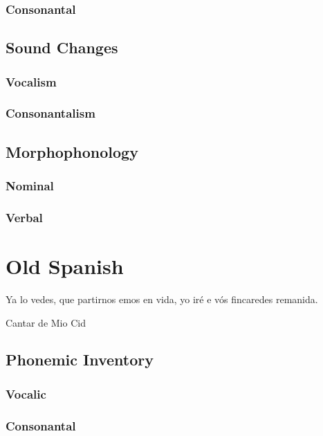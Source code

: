 \documentclass{report}
\begin{document}
\subsection{Consonantal}

\section{Sound Changes}

\subsection{Vocalism}

\subsection{Consonantalism}

\section{Morphophonology}

\subsection{Nominal}

\subsection{Verbal}

\chapter{Old Spanish}

\epigraph{Ya lo vedes, que partirnos emos en vida, yo iré e vós fincaredes remanida.}{Cantar de Mio Cid}

\section{Phonemic Inventory}

\subsection{Vocalic}

\subsection{Consonantal}
\end{document}
